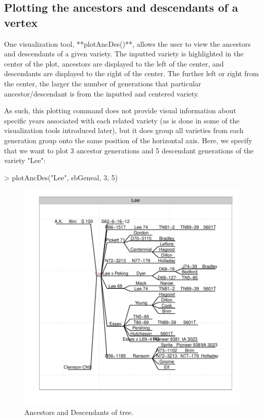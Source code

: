 \documentclass{article}
\numberwithin{equation}{section} %
\begin{document}
\subsection{Plotting the ancestors and descendants of a vertex}

One visualization tool, **plotAncDes()**, allows the user to view the ancestors and descendants of a given variety. The inputted variety is highlighted in the center of the plot, ancestors are displayed to the left of the center, and descendants are displayed to the right of the center. The further left or right from the center, the larger the number of generations that particular ancestor/descendant is from the inputted and centered variety.

As such, this plotting command does not provide visual information about specific years associated with each related variety (as is done in some of the visualization tools introduced later), but it does group all varieties from each generation group onto the same position of the horizontal axis. Here, we specify that we want to plot 3 ancestor generations and 5 descendant generations of the variety "Lee":

\begin{Schunk}
\begin{Sinput}
> plotAncDes("Lee", sbGeneal, 3, 5)
\end{Sinput}
\end{Schunk}

\begin{figure} 
  \begin{center} 
\includegraphics{ggenealogy-plotAncDes1}
\end{center} 
\caption{Ancestors and Descendants of tree.}
\label{fig:plotAncDes1}
\end{figure}
\end{document}
